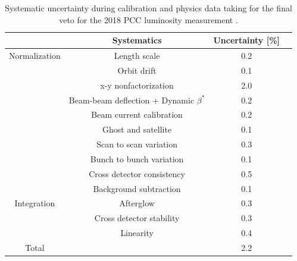 \begin{table}[htbp]
  \centering
  \caption[2018 luminosity systematic uncertainty]{Systematic uncertainty during calibration and physics data taking for the final veto for the 2018 PCC luminosity measurement \cite{pas_18}.}
\label{tab:systematic-uncertainty}
\begin{tabular}{cccc}
  \textbf{}&\textbf{Systematics} &\textbf{Uncertainty [\%]} \\
\hline
Normalization  & Length scale & 0.2  \\
 & Orbit drift &  0.1  \\
 & x-y nonfactorization & 2.0 \\
 & Beam-beam deflection + Dynamic $\beta^{*}$  & 0.2 \\
 & Beam current calibration  & 0.2 \\
 & Ghost and satellite & 0.1 \\
 & Scan to scan variation & 0.3 \\
 & Bunch to bunch variation & 0.1 \\
 & Cross detector consistency  & 0.5 \\
& Background subtraction  & 0.1 \\
\hline
Integration & Afterglow  &  0.3 \\
 & Cross detector stability & 0.3 \\
& Linearity  & 0.4 \\
\hline
Total &  &  2.2 \\
\end{tabular}
\label{tab:systematic-uncertainty}
\end{table}

